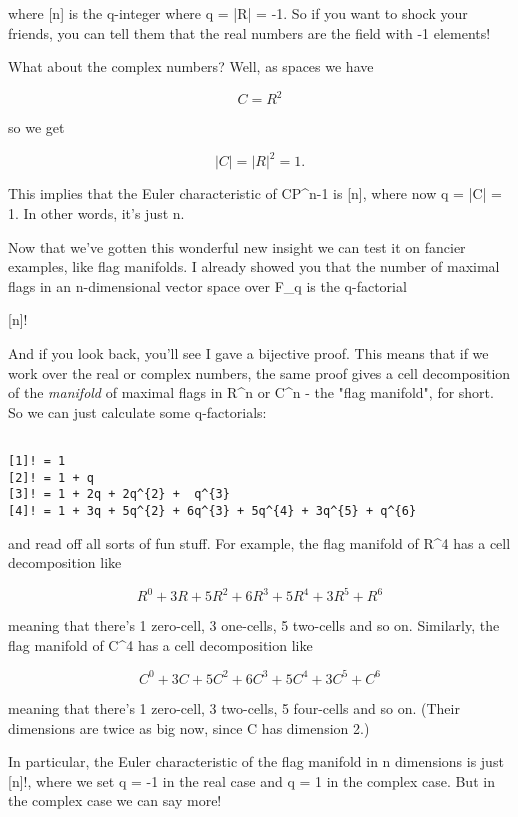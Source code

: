 where [n] is the q-integer where q = |R| = -1.  So if you want to shock
your friends, you can tell them that the real numbers are the field with
-1 elements!

What about the complex numbers?  Well, as spaces we have 


$$

C = R^{2}
$$
    
so we get


$$

|C| = |R|^{2} = 1.
$$
    
This implies that the Euler characteristic of CP^{n-1} is [n], where
now q = |C| = 1.  In other words, it's just n.  

Now that we've gotten this wonderful new insight we can test it on
fancier examples, like flag manifolds.  I already showed you that the
number of maximal flags in an n-dimensional vector space over F_{q} is 
the q-factorial 

[n]!  


And if you look back, you'll see I gave a bijective proof.  This means
that if we work over the real or complex numbers, the same proof gives a
cell decomposition of the \emph{manifold} of maximal flags in
R^{n} or C^{n} - the "flag manifold", for
short.  So we can just calculate some q-factorials:


\begin{verbatim}

[1]! = 1 
[2]! = 1 + q
[3]! = 1 + 2q + 2q^{2} +  q^{3}
[4]! = 1 + 3q + 5q^{2} + 6q^{3} + 5q^{4} + 3q^{5} + q^{6}
\end{verbatim}
    
and read off all sorts of fun stuff.  For example, the flag manifold
of R^{4} has a cell decomposition like


$$

     R^{0} + 3R + 5R^{2} + 6R^{3} + 5R^{4} + 3R^{5} + R^{6}
$$
    
meaning that there's 1 zero-cell, 3 one-cells, 5 two-cells and so on.
Similarly, the flag manifold of C^{4} has a cell decomposition like


$$

     C^{0} + 3C + 5C^{2} + 6C^{3} + 5C^{4} + 3C^{5} + C^{6}
$$
    
meaning that there's 1 zero-cell, 3 two-cells, 5 four-cells and so on.
(Their dimensions are twice as big now, since C has dimension 2.)

In particular, the Euler characteristic of the flag manifold in 
n dimensions is just [n]!, where we set q = -1 in the real case and 
q = 1 in the complex case.  But in the complex case we can say more!

